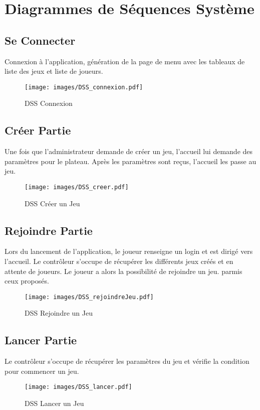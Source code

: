\section{Diagrammes de Séquences Système}
\subsection{Se Connecter}
Connexion à l'application, génération de la page de menu avec les tableaux de liste des jeux et liste de joueurs.
\begin{figure}[h!]
	\centering
	\texttt{[image: images/DSS\_connexion.pdf]}
	\caption{DSS Connexion}
\end{figure}
\newpage

\subsection{Créer Partie}
Une fois que l'administrateur demande de créer un jeu, l'accueil lui
demande des paramètres pour le plateau. Après les paramètres sont reçus, l'accueil les passe au jeu.

\begin{figure}[h!]
	\centering
	\texttt{[image: images/DSS\_creer.pdf]}
	\caption{DSS Créer un Jeu}
\end{figure}
\newpage

\subsection{Rejoindre Partie}
Lors du lancement de l'application, le joueur renseigne un login et est dirigé vers l'accueil. Le contrôleur s'occupe de récupérer les différents jeux créés et en attente de joueurs.
Le joueur a alors la possibilité de rejoindre un jeu. parmis ceux proposés.

\begin{figure}[h!]
	\centering
	\texttt{[image: images/DSS\_rejoindreJeu.pdf]}
	\caption{DSS Rejoindre un Jeu}
\end{figure}
\newpage

\subsection{Lancer Partie}
Le contrôleur s'occupe de récupérer les paramètres du jeu et vérifie la condition pour commencer un jeu.
\begin{figure}[h!]
	\centering
	\texttt{[image: images/DSS\_lancer.pdf]}
	\caption{DSS Lancer un Jeu}
\end{figure}
\newpage

